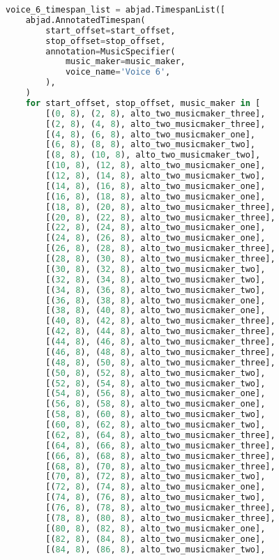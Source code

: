 \begin{lstlisting}[language=Python, caption=Invocation Source Code]
voice_6_timespan_list = abjad.TimespanList([
    abjad.AnnotatedTimespan(
        start_offset=start_offset,
        stop_offset=stop_offset,
        annotation=MusicSpecifier(
            music_maker=music_maker,
            voice_name='Voice 6',
        ),
    )
    for start_offset, stop_offset, music_maker in [
        [(0, 8), (2, 8), alto_two_musicmaker_three],
        [(2, 8), (4, 8), alto_two_musicmaker_three],
        [(4, 8), (6, 8), alto_two_musicmaker_one],
        [(6, 8), (8, 8), alto_two_musicmaker_two],
        [(8, 8), (10, 8), alto_two_musicmaker_two],
        [(10, 8), (12, 8), alto_two_musicmaker_one],
        [(12, 8), (14, 8), alto_two_musicmaker_two],
        [(14, 8), (16, 8), alto_two_musicmaker_one],
        [(16, 8), (18, 8), alto_two_musicmaker_one],
        [(18, 8), (20, 8), alto_two_musicmaker_three],
        [(20, 8), (22, 8), alto_two_musicmaker_three],
        [(22, 8), (24, 8), alto_two_musicmaker_one],
        [(24, 8), (26, 8), alto_two_musicmaker_one],
        [(26, 8), (28, 8), alto_two_musicmaker_three],
        [(28, 8), (30, 8), alto_two_musicmaker_three],
        [(30, 8), (32, 8), alto_two_musicmaker_two],
        [(32, 8), (34, 8), alto_two_musicmaker_two],
        [(34, 8), (36, 8), alto_two_musicmaker_two],
        [(36, 8), (38, 8), alto_two_musicmaker_one],
        [(38, 8), (40, 8), alto_two_musicmaker_one],
        [(40, 8), (42, 8), alto_two_musicmaker_three],
        [(42, 8), (44, 8), alto_two_musicmaker_three],
        [(44, 8), (46, 8), alto_two_musicmaker_three],
        [(46, 8), (48, 8), alto_two_musicmaker_three],
        [(48, 8), (50, 8), alto_two_musicmaker_three],
        [(50, 8), (52, 8), alto_two_musicmaker_two],
        [(52, 8), (54, 8), alto_two_musicmaker_two],
        [(54, 8), (56, 8), alto_two_musicmaker_one],
        [(56, 8), (58, 8), alto_two_musicmaker_one],
        [(58, 8), (60, 8), alto_two_musicmaker_two],
        [(60, 8), (62, 8), alto_two_musicmaker_two],
        [(62, 8), (64, 8), alto_two_musicmaker_three],
        [(64, 8), (66, 8), alto_two_musicmaker_three],
        [(66, 8), (68, 8), alto_two_musicmaker_three],
        [(68, 8), (70, 8), alto_two_musicmaker_three],
        [(70, 8), (72, 8), alto_two_musicmaker_two],
        [(72, 8), (74, 8), alto_two_musicmaker_one],
        [(74, 8), (76, 8), alto_two_musicmaker_two],
        [(76, 8), (78, 8), alto_two_musicmaker_three],
        [(78, 8), (80, 8), alto_two_musicmaker_three],
        [(80, 8), (82, 8), alto_two_musicmaker_one],
        [(82, 8), (84, 8), alto_two_musicmaker_one],
        [(84, 8), (86, 8), alto_two_musicmaker_two],

\end{lstlisting}
